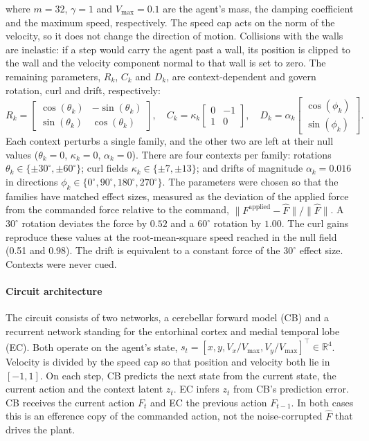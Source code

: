 where $m = 32$, $\gamma = 1$ and $V_{\max} = 0.1$ are the agent's mass, the damping coefficient and the maximum speed, respectively. The speed cap acts on the norm of the velocity, so it does not change the direction of motion. Collisions with the walls are inelastic: if a step would carry the agent past a wall, its position is clipped to the wall and the velocity component normal to that wall is set to zero. The remaining parameters, $R_k$, $C_k$ and $D_k$, are context-dependent and govern rotation, curl and drift, respectively:
\begin{equation*}
    R_k = \begin{bmatrix}
        \cos(\theta_k) & -\sin(\theta_k) \\
        \sin(\theta_k) & \cos(\theta_k)
    \end{bmatrix}, \quad C_k = \kappa_k \begin{bmatrix}
        0 & -1 \\
        1 & 0
    \end{bmatrix}, \quad D_k = \alpha_k \begin{bmatrix}
        \cos(\phi_k) \\ \sin(\phi_k)
    \end{bmatrix}.
\end{equation*}
Each context perturbs a single family, and the other two are left at their null values ($\theta_k = 0$, $\kappa_k = 0$, $\alpha_k = 0$). There are four contexts per family: rotations $\theta_k \in \{\pm 30^\circ, \pm 60^\circ\}$; curl fields $\kappa_k \in \{\pm 7, \pm 13\}$; and drifts of magnitude $\alpha_k = 0.016$ in directions $\phi_k \in \{0^\circ, 90^\circ, 180^\circ, 270^\circ\}$. The parameters were chosen so that the families have matched effect sizes, measured as the deviation of the applied force from the commanded force relative to the command, $\lVert F^{\text{applied}} - \hat{F} \rVert / \lVert \hat{F} \rVert$. A $30^\circ$ rotation deviates the force by $0.52$ and a $60^\circ$ rotation by $1.00$. The curl gains reproduce these values at the root-mean-square speed reached in the null field (0.51 and 0.98). The drift is equivalent to a constant force of the $30^\circ$ effect size. Contexts were never cued.

\paragraph{Circuit architecture}
The circuit consists of two networks, a cerebellar forward model (CB) and a recurrent network standing for the entorhinal cortex and medial temporal lobe (EC). Both operate on the agent's state, $s_t = [x, y, V_x / V_{\max}, V_y / V_{\max}]^\top \in \mathbb{R}^4$. Velocity is divided by the speed cap so that position and velocity both lie in $[-1, 1]$. On each step, CB predicts the next state from the current state, the current action and the context latent $z_t$. EC infers $z_t$ from CB's prediction error. CB receives the current action $F_t$ and EC the previous action $F_{t-1}$. In both cases this is an efference copy of the commanded action, not the noise-corrupted $\hat{F}$ that drives the plant.

